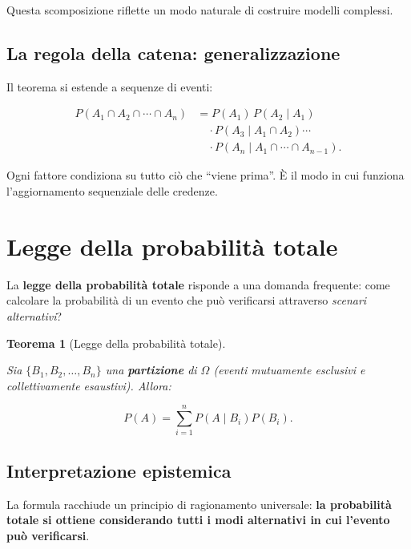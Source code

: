 \documentclass[
  italian,
  letterpaper,
  a4paper,
  11pt,
  open=any]{scrbook}
\theoremstyle{plain}
\newtheorem{theorem}{Teorema}[chapter]
\theoremstyle{definition}
\theoremstyle{definition}
\theoremstyle{remark}
\begin{document}
Questa scomposizione riflette un modo naturale di costruire modelli
complessi.

\subsection{La regola della catena:
generalizzazione}\label{la-regola-della-catena-generalizzazione}

Il teorema si estende a sequenze di eventi:

\[
\begin{aligned}
P(A_1 \cap A_2 \cap \cdots \cap A_n)
&= P(A_1)\, P(A_2 \mid A_1) \\
&\quad \cdot P(A_3 \mid A_1 \cap A_2) \cdots \\
&\quad \cdot P(A_n \mid A_1 \cap \cdots \cap A_{n-1}).
\end{aligned}
\]

Ogni fattore condiziona su tutto ciò che ``viene prima''. È il modo in
cui funziona l'aggiornamento sequenziale delle credenze.

\section{Legge della probabilità totale}\label{sec-total-probability}

La \textbf{legge della probabilità totale} risponde a una domanda
frequente: come calcolare la probabilità di un evento che può
verificarsi attraverso \emph{scenari alternativi}?

\begin{theorem}[Legge della probabilità
totale]\protect\hypertarget{thm-total-probability}{}\label{thm-total-probability}

Sia \(\{B_1, B_2, \ldots, B_n\}\) una \textbf{partizione} di \(\Omega\)
(eventi mutuamente esclusivi e collettivamente esaustivi). Allora:

\[
P(A) = \sum_{i=1}^{n} P(A \mid B_i) P(B_i).
\]

\end{theorem}

\subsection{Interpretazione
epistemica}\label{interpretazione-epistemica}

La formula racchiude un principio di ragionamento universale: \textbf{la
probabilità totale si ottiene considerando tutti i modi alternativi in
cui l'evento può verificarsi}.
\end{document}
